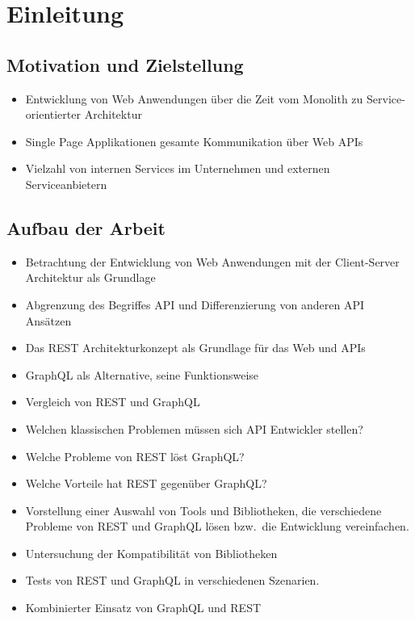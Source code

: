 \section{Einleitung}

\subsection{Motivation und Zielstellung}
\begin{itemize}
  \item Entwicklung von Web Anwendungen über die Zeit vom Monolith zu Service-orientierter Architektur
  \item Single Page Applikationen gesamte Kommunikation über Web APIs
  \item Vielzahl von internen Services im Unternehmen und externen Serviceanbietern
\end{itemize}
\subsection{Aufbau der Arbeit}
\begin{itemize}
  \item Betrachtung der Entwicklung von Web Anwendungen mit der Client-Server Architektur als Grundlage
  \item Abgrenzung des Begriffes API und Differenzierung von anderen API Ansätzen
  \item Das REST Architekturkonzept als Grundlage für das Web und APIs
  \item GraphQL als Alternative, seine Funktionsweise
  \item Vergleich von REST und GraphQL
  \item Welchen klassischen Problemen müssen sich API Entwickler stellen?
  \item Welche Probleme von REST löst GraphQL\@?
  \item Welche Vorteile hat REST gegenüber GraphQL\@?
  \item Vorstellung einer Auswahl von Tools und Bibliotheken, die verschiedene Probleme von REST und GraphQL lösen bzw.\ die Entwicklung vereinfachen.
  \item Untersuchung der Kompatibilität von Bibliotheken
  \item Tests von REST und GraphQL in verschiedenen Szenarien.
  \item Kombinierter Einsatz von GraphQL und REST
\end{itemize}